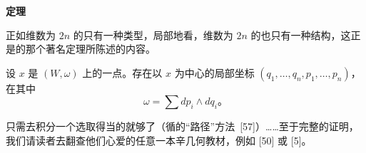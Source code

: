 \textbf{\trDarboux{}定理}

正如维数为 $2n$ 的\trSymplectic{}\trVectorSpace{}只有一种类型，局部地看，维数为 $2n$ 的\trSymplectic{}\trManifold{}也只有一种结构，这正是\trDarboux{}的那个著名定理所陈述的内容。

\begin{theorem}[\trDarboux]\label{thm:darboux-theorem}
设 $x$ 是\trSymplectic{}\trManifold{} $(W,\omega)$ 上的一点。存在以 $x$ 为中心的局部坐标 $(q_1,\dotsc,q_n,p_1,\dotsc,p_n)$，在其中
\[
\omega=\sum dp_i\wedge dq_i\text{。}
\]
\end{theorem}

只需去积分一个选取得当的\trVectorField{}就够了（循\trMoser{}的“路径”方法~[57]）……至于完整的证明，我们请读者去翻查他们心爱的任意一本辛几何教材，例如 [50] 或 [5]。
